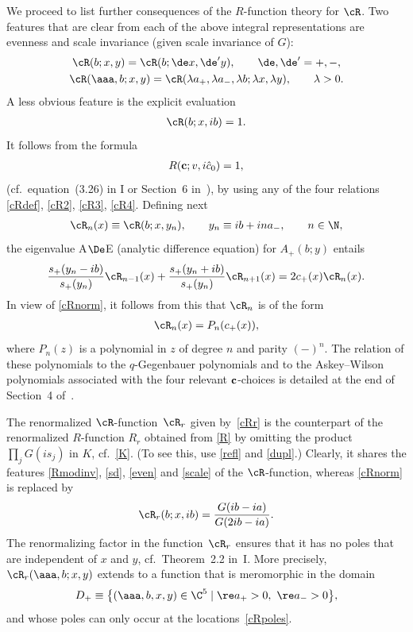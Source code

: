 \documentclass[pdftex]{sigma}
\numberwithin{equation}{section}
\begin{document}
We proceed to list further consequences of the $R$-function theory for $\cR$. Two features that are clear from each of the above integral representations are evenness and scale invariance (given scale invariance of $G$):
\begin{gather}\label{even}
\cR (b;x,y)=\cR(b;\de x, \de'y),\qquad \de,\de'=+,-,
\\
\label{scale}
\cR(\aaa,b;x,y)=\cR(\lambda  a_{+},\lambda a_{-}, \lambda b;\lambda x,\lambda y),\qquad \lambda>0.
\end{gather}
A less obvious feature is the explicit evaluation
\begin{gather}\label{cRnorm}
\cR(b;x,ib)=1.
\end{gather}
It follows from the formula
\begin{gather}
R({\bf c};v,i\hat{c}_0)=1,
\end{gather}
(cf.~equation~(3.26) in I or Section~6 in~\cite{Rsurv}), by using any of the four relations \eqref{cRdef}, \eqref{cR2}, \eqref{cR3}, \eqref{cR4}.
Def\/ining next
\begin{gather}
\cR_n(x)\equiv \cR(b;x,y_n),\qquad y_n\equiv ib+ina_{-},\qquad n\in\N,
\end{gather}
the eigenvalue A$\De$E (analytic dif\/ference equation) for $A_{+}(b;y)$ entails
\begin{gather}
 \frac{s_{+}(y_n-ib)}{s_{+}(y_n)}\cR_{n-1}(x)+\frac{s_{+}(y_n+ib)}{s_{+}(y_n)}\cR_{n+1}(x)=2c_{+}(x)\cR_n(x).
\end{gather}
In view of \eqref{cRnorm}, it follows from this that $\cR_n$ is of the form
\begin{gather}\label{qGeg}
\cR_n(x)=P_n(c_{+}(x)),
\end{gather}
where $P_n(z)$ is a polynomial in $z$ of degree $n$ and parity $(-)^n$. The relation of these polynomials to the $q$-Gegenbauer polynomials and to the  Askey--Wilson polynomials associated with the four relevant ${\bf c}$-choices is detailed at the end of Section~4 of~\cite{quad}.

The renormalized $\cR$-function~$\cR_r$ given by~\eqref{cRr}
is the counterpart of the renormalized $R$-function $R_r$ obtained from \eqref{R} by omitting the product $\prod_jG(is_j)$ in $K$, cf.~\eqref{K}. (To see this, use \eqref{refl} and \eqref{dupl}.) Clearly, it shares the features \eqref{Rmodinv}, \eqref{sd}, \eqref{even} and \eqref{scale} of the $\cR$-function, whereas \eqref{cRnorm} is replaced by
\begin{gather}\label{cRrnorm}
\cR_r(b;x,ib)=\frac{G(ib-ia)}{G(2ib-ia)}.
\end{gather}
The renormalizing factor in the function~$\cR_r$ ensures that it has no poles that are independent of $x$ and $y$, cf.~Theorem~2.2 in~I. More precisely, $\cR_r(\aaa,b;x,y)$ extends to a function that is meromorphic in the domain{\samepage
\begin{gather}\label{Dp}
D_+\equiv \big\{ (\aaa,b,x,y)\in \C^5 \mid \re a_+>0,\ \re a_->0\big\},
\end{gather}
and whose poles can only occur at the locations~\eqref{cRpoles}.}
\end{document}
